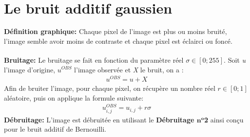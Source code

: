 \documentclass{article}
\begin{document}
	
		\newpage
		
		
	
		\section{Le bruit additif gaussien}
		\textbf{Définition graphique: }Chaque pixel de l'image est plus ou moins bruité, l'image semble avoir moins de contraste et chaque pixel est éclairci ou foncé.\\\\
		\textbf{Bruitage: }Le bruitage se fait en fonction du paramètre réel \begin{math}\sigma\in[0;255]\end{math}. Soit \emph{u} l'image d'origine, \begin{math}u^{OBS}\end{math} l'image observée et \emph{X} le bruit, on a :
		\begin{align*}
			u^{OBS} = u + X
		\end{align*}
		Afin de bruiter l'image, pour chaque pixel, on récupère un nombre réel \begin{math}r \in [0;1]\end{math} aléatoire, puis on applique la formule suivante:
		\begin{align*}
			u^{OBS}_{i,j} = u_{i,j} + r\sigma
		\end{align*}
		\textbf{Débruitage: }L'image est débruitée en utilisant le \textbf{Débruitage \begin{math}\textbf{n}^\textbf{o}\end{math}2} ainsi conçu pour le bruit additif de Bernouilli.\\\\
\end{document}
